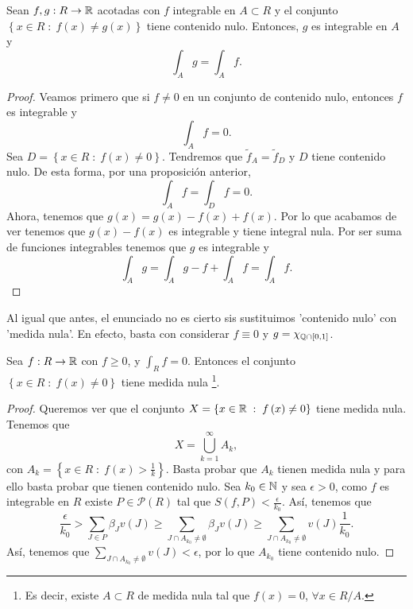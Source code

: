\begin{colorary}
	Sean $\displaystyle f,g : R \to \mathbb{R} $ acotadas con $\displaystyle f $ integrable en $\displaystyle A \subset R $ y el conjunto $\displaystyle \left\{ x \in R \; : \; f\left(x\right) \neq g\left(x\right)\right\}  $ tiene contenido nulo. Entonces, $\displaystyle g $ es integrable en $\displaystyle A $ y 
	\[\int _{A}g = \int _{A}f  .\]
\end{colorary}
\begin{proof}
	Veamos primero que si $\displaystyle f \neq 0 $ en un conjunto de contenido nulo, entonces $\displaystyle f $ es integrable y 
	\[\int _{A}f =0 .\]
	Sea $\displaystyle D = \left\{ x \in R \; : \; f\left(x\right)\neq 0\right\}  $. Tendremos que $\displaystyle \tilde{f}_{A}=\tilde{f}_{D} $ y $\displaystyle D $ tiene contenido nulo. De esta forma, por una proposición anterior, 
	\[\int _{A}f =\int _{D}f = 0 .\]
Ahora, tenemos que $\displaystyle g\left(x\right) = g\left(x\right)-f\left(x\right) + f\left(x\right) $. Por lo que acabamos de ver tenemos que $\displaystyle g\left(x\right)-f\left(x\right) $ es integrable y tiene integral nula. Por ser suma de funciones integrables tenemos que $\displaystyle g $ es integrable y
\[\int _{A}g = \int _{A}g - f + \int _{A}f = \int _{A}f  .\]
\end{proof}
\begin{observation}
	Al igual que antes, el enunciado no es cierto sis sustituimos 'contenido nulo' con 'medida nula'. En efecto, basta con considerar $\displaystyle f \equiv 0 $ y $\displaystyle g = \chi_{\mathbb{Q} \cap \left[0,1\right] } $. 
\end{observation}

\begin{prop}
	Sea $\displaystyle f : R \to \mathbb{R} $ con $\displaystyle f \geq 0 $, y $\displaystyle \int _{R}f = 0 $. Entonces el conjunto $\displaystyle \left\{ x \in R \; : \; f\left(x\right) \neq 0\right\}  $ tiene medida nula \footnote{Es decir, existe $\displaystyle A \subset R $ de medida nula tal que $\displaystyle f\left(x\right) = 0 $, $\displaystyle \forall x \in R/A $.}.  
\end{prop}
\begin{proof}
	Queremos ver que el conjunto $\displaystyle X =\left\{ x \in \mathbb{R} \; : \; f\left(x\right) \neq 0\right\}  $ tiene medida nula. Tenemos que 
	\[ X = \bigcup_{k = 1}^{\infty} A_{k}  ,\]
con $\displaystyle A_{k} = \left\{ x \in R \; : \; f\left(x\right) > \frac{1}{k}\right\} $. Basta probar que $\displaystyle A_{k} $ tienen medida nula y para ello basta probar que tienen contenido nulo. Sea $\displaystyle k_{0} \in \mathbb{N} $ y sea $\displaystyle \epsilon > 0 $, como $\displaystyle f $ es integrable en $\displaystyle R $ existe $\displaystyle P \in \mathcal{P}\left(R\right) $ tal que $\displaystyle S\left(f,P\right)< \frac{\epsilon }{k_{0}} $. Así, tenemos que 
	\[\frac{\epsilon }{k_{0}} > \sum_{J \in P}\beta_{J}v\left(J\right) \geq \sum_{J \cap A_{k_{0}}\neq \emptyset}\beta_{J}v\left(J\right) \geq \sum_{J \cap A_{k_{0}} \neq \emptyset} v\left(J\right)\frac{1}{k_{0}}.\]
Así, tenemos que $\displaystyle \sum^{}_{J \cap A_{k_{0}}\neq \emptyset}v\left(J\right) < \epsilon  $, por lo que $\displaystyle A_{k_{0}} $ tiene contenido nulo. 	
\end{proof}

